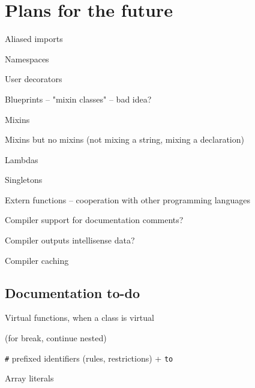 \chapter{Plans for the future}
\begin{compactitem}
	\item Aliased imports
	\item Namespaces
	\item User decorators
	\item Blueprints -- "mixin classes" -- bad idea?
	\item Mixins
	\item Mixins but no mixins (not mixing a string, mixing a declaration)
	\item Lambdas
	\item Singletons
	\item Extern functions -- cooperation with other programming languages
	\item Compiler support for documentation comments?
	\item Compiler outputs intellisense data?
	\item Compiler caching
\end{compactitem}

\section{Documentation to-do}
\begin{compactitem}
	\item Virtual functions, when a class is virtual
	\item {}
	\item {} (for break, continue nested)
	\item {}
	\item \verb|#| prefixed identifiers (rules, restrictions) + \verb|to|
	\item {}
	\item Array literals
\end{compactitem}

          

